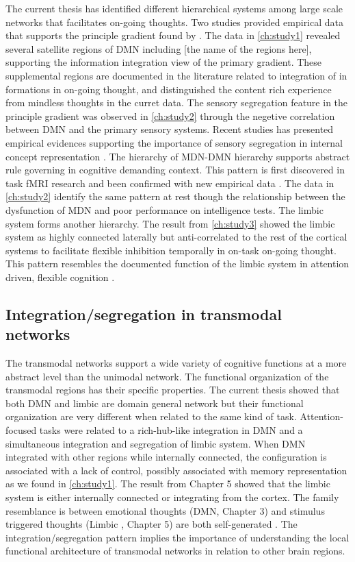 The current thesis has identified different hierarchical systems among large scale networks that facilitates on-going thoughts. Two studies provided empirical data that supports the principle gradient found by . The data in \cref{ch:study1} revealed several satellite regions of DMN including [the name of the regions here], supporting the information integration view of the primary gradient. These supplemental regions are documented in the literature related to integration of in formations in on-going thought\cite{Ellamil2016,Karapanagiotidis2017,Smallwood2016}, and distinguished the content rich experience from mindless thoughts in the curret data. The sensory segregation feature in the principle gradient was observed in \cref{ch:study2} through the negetive correlation between DMN and the primary sensory systems. Recent studies has presented empirical evidences supporting the importance of sensory segregation in internal concept representation \cite{Murphy2018,Villena-Gonzalez2018}. The hierarchy of MDN-DMN hierarchy supports abstract rule governing in cognitive demanding context. This pattern is first discovered in task fMRI research \cite{Duncan2010} and been confirmed with new empirical data \cite{Crittenden2016}. The data in \cref{ch:study2} identify the same pattern at rest though the relationship between the dysfunction of MDN and poor performance on intelligence tests. The limbic system forms another hierarchy. The result from \cref{ch:study3} showed the limbic system as highly connected laterally but anti-correlated to the rest of the cortical systems to facilitate flexible inhibition temporally in on-task on-going thought. This pattern resembles the documented function of the limbic system in attention driven, flexible cognition \cite{Kleckner2017}.

\subsection{Integration/segregation in transmodal networks}
The transmodal networks support a wide variety of cognitive functions at a more abstract level than the unimodal network. The functional organization of the transmodal regions has their specific properties. The current thesis showed that both DMN and limbic are domain general network but their functional organization are very different when related to the same kind of task. Attention-focused tasks were related to a rich-hub-like integration in DMN and a simultaneous integration and segregation of limbic system. When DMN integrated with other regions while internally connected, the configuration is associated with a lack of control, possibly associated with memory representation as we found in \cref{ch:study1}. The result from Chapter 5 showed that the limbic system is either internally connected or integrating from the cortex. The family resemblance is between emotional thoughts (DMN, Chapter 3) and stimulus triggered thoughts (Limbic , Chapter 5) are both self-generated \cite{Tusche2014}. The integration/segregation pattern implies the importance of understanding the local functional architecture \cite{Braga2015} of transmodal networks in relation to other brain regions.

